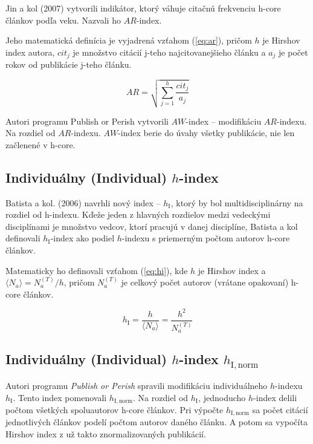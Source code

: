 Jin a kol (2007) vytvorili indikátor, ktorý váhuje citačnú frekvenciu h-core
článkov podľa veku. Nazvali ho $\mathit{AR}$-index.

Jeho matematická definícia je vyjadrená vzťahom (\ref{eq:ar}), pričom $h$ je
Hirshov index autora, $\mathit{cit}_j$ je množstvo citácií j-teho najcitovanejšieho článku a
$a_j$ je počet rokov od publikácie j-teho článku.

\begin{equation}
\label{eq:ar}
\mathit{AR} = \sqrt{\sum_{j=1}^h{\frac{\mathit{cit}_j}{a_j}}}
\end{equation}

Autori programu Publish or Perish vytvorili $\mathit{AW}$-index -- modifikáciu
$\mathit{AR}$-indexu. Na rozdiel od $\mathit{AR}$-indexu. $\mathit{AW}$-index
berie do úvahy všetky publikácie, nie len začlenené v h-core.


\subsection{Individuálny (Individual) $h$-index}

Batista a kol. (2006) navrhli nový index -- $h_{\mathrm{I}}$, ktorý by bol
multidisciplinárny na rozdiel od h-indexu. Kďeže jeden z hlavných rozdielov
medzi vedeckými disciplínami je množstvo vedcov, ktorí pracujú v danej
disciplíne, Batista a kol definovali $h_{\mathrm{I}}$-index ako podiel
$h$-indexu s priemerným počtom autorov h-core článkov.

Matematicky ho definovali vzťahom (\ref{eq:hi}), kde $h$ je Hirshov index a
$\langle N_a \rangle = N_a^{(T)} / h$, pričom $N_a^{(T)}$ je celkový počet
autorov (vrátane opakovaní) h-core článkov.

\begin{equation}
\label{eq:hi}
h_{\mathrm{I}} = \frac{h}{\langle N_a \rangle} = \frac{h^2}{N_a^{(T)}}
\end{equation}


\subsection{Individuálny (Individual) $h$-index $h_{\mathrm{I, norm}}$}

Autori programu \emph{Publish or Perish} spravili modifikáciu individuálneho
$h$-indexu $h_{\mathrm{I}}$. Tento index pomenovali $h_{\mathrm{I, norm}}$. Na
rozdiel od $h_{\mathrm{I}}$, jednoducho $h$-index delili počtom všetkých
spoluautorov h-core článkov. Pri výpočte $h_{\mathrm{I, norm}}$ sa počet citácií
jednotlivých článkov podelí počtom autorov daného článku. A potom sa vypočíta
Hirshov index z už takto znormalizovaných publikácií.


